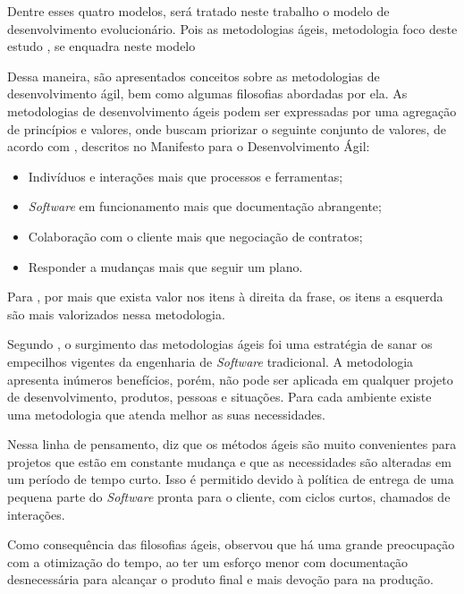 Dentre esses quatro modelos, será tratado neste trabalho o modelo de desenvolvimento 
evolucionário. Pois as metodologias ágeis, metodologia foco deste estudo
, se enquadra neste modelo


Dessa maneira, são apresentados conceitos sobre as metodologias de desenvolvimento ágil, bem como algumas filosofias abordadas por ela.
As metodologias de desenvolvimento ágeis podem ser expressadas por uma agregação de princípios e valores, onde buscam priorizar o seguinte conjunto de valores, de acordo com \cite{beck2001agile}, descritos no Manifesto para o Desenvolvimento Ágil:


\begin{itemize}
    \item Indivíduos e interações mais que processos e ferramentas;
    \item \textit{Software} em funcionamento mais que documentação abrangente;
    \item Colaboração com o cliente mais que negociação de contratos;
    \item Responder a mudanças mais que seguir um plano.
\end{itemize}

Para \cite{beck2001agile}, por mais que exista valor nos itens à direita da frase, os itens a esquerda são mais valorizados nessa metodologia.

Segundo \cite{pressman2009engenharia}, o surgimento das metodologias ágeis foi uma estratégia de sanar os empecilhos vigentes da engenharia de \textit{Software} tradicional. A metodologia apresenta inúmeros benefícios, porém, não pode ser aplicada em qualquer projeto de desenvolvimento, produtos, pessoas e situações. Para cada ambiente existe uma metodologia que atenda melhor as suas necessidades.

Nessa linha de pensamento, \cite{pressman2009engenharia} diz que os métodos ágeis são muito convenientes para projetos que estão em constante mudança e que as necessidades são alteradas em um período de tempo curto. Isso é permitido devido à política de entrega de uma pequena parte do \textit{Software} pronta para o cliente, com ciclos curtos, chamados de interações.

Como consequência das filosofias ágeis, \cite{soares} observou que há uma grande preocupação com a otimização do tempo, ao ter um esforço menor com documentação desnecessária para alcançar o produto final e mais devoção para na produção.

